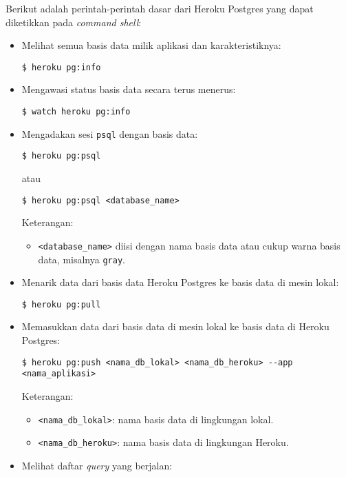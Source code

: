 Berikut adalah perintah-perintah dasar dari Heroku Postgres yang dapat diketikkan pada \textit{command shell}:
\begin{itemize}
\item Melihat semua basis data milik aplikasi dan karakteristiknya:
\begin{lstlisting}
$ heroku pg:info
\end{lstlisting}

\item Mengawasi status basis data secara terus menerus:
\begin{lstlisting}
$ watch heroku pg:info
\end{lstlisting}

\item Mengadakan sesi \texttt{psql} dengan basis data:
\begin{lstlisting}
$ heroku pg:psql
\end{lstlisting}
atau
\begin{lstlisting}
$ heroku pg:psql <database_name>
\end{lstlisting}
Keterangan:
\begin{itemize}
\item \texttt{<database\_name>} diisi dengan nama basis data atau cukup warna basis data, misalnya \texttt{gray}.
\end{itemize}

\item Menarik data dari basis data Heroku Postgres ke basis data di mesin lokal:

\begin{lstlisting}
$ heroku pg:pull
\end{lstlisting}

\item Memasukkan data dari basis data di mesin lokal ke basis data di Heroku Postgres:

\begin{lstlisting}
$ heroku pg:push <nama_db_lokal> <nama_db_heroku> --app <nama_aplikasi>
\end{lstlisting}
Keterangan:
\begin{itemize}
\item \texttt{<nama\_db\_lokal>}: nama basis data di lingkungan lokal.
\item \texttt{<nama\_db\_heroku>}: nama basis data di lingkungan Heroku.
\end{itemize}

\item Melihat daftar \textit{query} yang berjalan:


\end{itemize}
